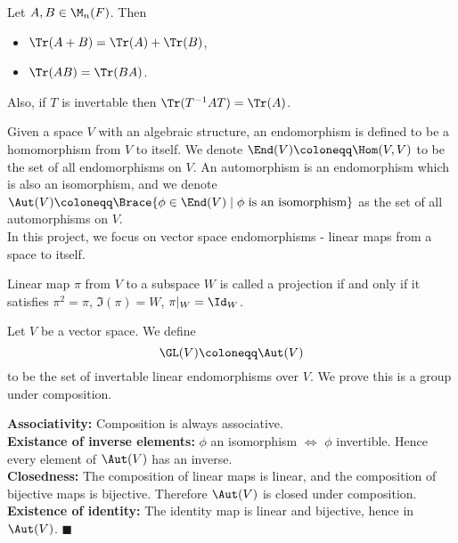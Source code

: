 \documentclass[../Project.tex]{subfiles}
\begin{document}
\begin{prop}
\label{7}
	Let $A,B \in \M_n(F)$. Then
	\begin{itemize}
		\item $\Tr(A + B) = \Tr(A) + \Tr(B)$,
		\item $\Tr(AB) = \Tr(BA)$.
	\end{itemize}

	Also, if $T$ is invertable then $\Tr(T^{-1}AT) = \Tr(A)$.
\end{prop}

\begin{defi}
	Given a space $V$ with an algebraic structure, an endomorphism is defined to be a homomorphism from $V$ to itself. We denote $\End(V) \coloneqq \Hom(V,V)$ to be the set of all endomorphisms on $V$. An automorphism is an endomorphism which is also an isomorphism, and we denote $\Aut(V) \coloneqq \Brace{\phi \in \End(V)\;|\;\phi \text{ is an isomorphism}}$ as the set of all automorphisms on $V$.\\

	In this project, we focus on vector space endomorphisms - linear maps from a space to itself.
\end{defi}

\begin{defi}
	Linear map $\pi$ from $V$ to a subspace $W$ is called a projection if and only if it satisfies $\pi^2 = \pi$, $\Im(\pi) = W$, $\pi\vert_W = \Id_W$.
\end{defi}




\begin{defi}
	Let $V$ be a vector space. We define
	$$\GL(V) \coloneqq \Aut(V)$$
	to be the set of invertable linear endomorphisms over $V$. We prove this is a group under composition.\label{1}
\end{defi}

\begin{proo*}
	\textbf{Associativity:} Composition is always associative.\\
	\textbf{Existance of inverse elements:} $\phi$ an isomorphism $\iff$ $\phi$ invertible. Hence every element of $\Aut(V)$ has an inverse.\\
	\textbf{Closedness:} The composition of linear maps is linear, and the composition of bijective maps is bijective. Therefore $\Aut(V)$ is closed under composition.\\
	\textbf{Existence of identity:} The identity map is linear and bijective, hence in $\Aut(V)$. $\blacksquare$
\end{proo*}
\end{document}
